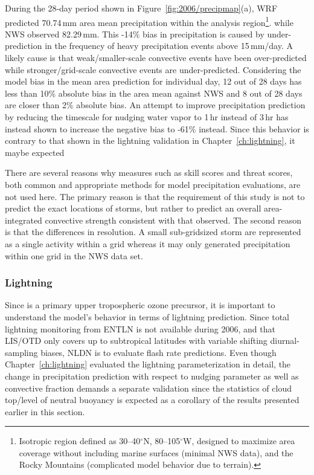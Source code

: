 During the 28-day period shown in Figure~\ref{fig:2006/precipmap}(a), WRF predicted 70.74\,\unit{mm} area mean
precipitation within the analysis region\footnote{Isotropic region defined as 30--40$^\circ$N, 80--105$^\circ$W, designed
to maximize area coverage without including marine surfaces (minimal NWS data), and the Rocky Mountains (complicated
model behavior due to terrain).}. while NWS observed 82.29\,\unit{mm}. This -14\% bias in precipitation
is caused by under-prediction in the frequency of heavy precipitation events above 15\,\unit{mm/day}. A likely
cause is that weak/smaller-scale convective events have been over-predicted while stronger/grid-scale convective
events are under-predicted.  Considering the model bias in the mean area prediction for individual day, 12 out of
28 days has less than 10\% absolute bias in the area mean against NWS and 8 out of 28 days are closer than
2\% absolute bias. An attempt to improve precipitation prediction by reducing the timescale for nudging
water vapor to 1\,\unit{hr} instead of 3\,\unit{hr} has instead shown to increase the negative bias to -61\% instead.
Since this behavior is contrary to that shown in the lightning validation in Chapter~\ref{ch:lightning}, it maybe expected

There are several reasons why measures such as skill scores and threat scores, both common and appropriate methods for
model precipitation evaluations, are not used here. The primary reason is that the requirement of this study is not to predict
the exact locations of storms, but rather to predict an overall area-integrated convective strength consistent with that
observed. The second reason is that the differences in resolution. A small sub-gridsized storm are represented as
a single activity within a {} grid whereas it may only generated precipitation within one {} grid
in the NWS data set.

\subsubsection{Lightning}

Since {\lnox} is a primary upper tropospheric ozone precursor, it is important to understand the model's behavior in
terms of lightning prediction. Since total lightning monitoring from ENTLN is not available during 2006, and that LIS/OTD
only covers up to subtropical latitudes with variable shifting diurnal-sampling biases, NLDN is to evaluate flash rate predictions.
Even though Chapter~\ref{ch:lightning} evaluated the lightning parameterization in detail, the change in precipitation
prediction with respect to nudging parameter as well as convective fraction demands a separate validation since
the statistics of cloud top/level of neutral buoyancy is expected as a corollary of the results presented earlier in this section.

